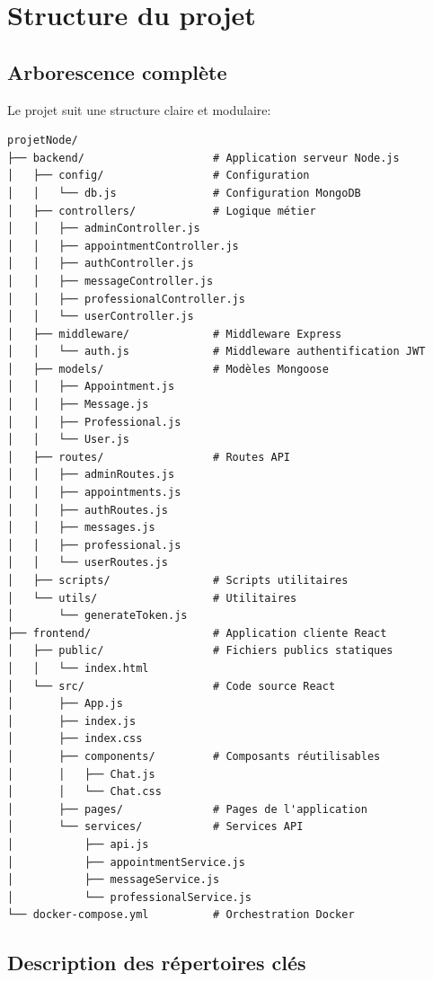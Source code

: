 \documentclass[12pt,a4paper]{article}
\begin{document}
\section{Structure du projet}

\subsection{Arborescence complète}

Le projet suit une structure claire et modulaire:

\begin{verbatim}
projetNode/
├── backend/                    # Application serveur Node.js
│   ├── config/                 # Configuration
│   │   └── db.js               # Configuration MongoDB
│   ├── controllers/            # Logique métier
│   │   ├── adminController.js
│   │   ├── appointmentController.js
│   │   ├── authController.js
│   │   ├── messageController.js
│   │   ├── professionalController.js
│   │   └── userController.js
│   ├── middleware/             # Middleware Express
│   │   └── auth.js             # Middleware authentification JWT
│   ├── models/                 # Modèles Mongoose
│   │   ├── Appointment.js
│   │   ├── Message.js
│   │   ├── Professional.js
│   │   └── User.js
│   ├── routes/                 # Routes API
│   │   ├── adminRoutes.js
│   │   ├── appointments.js
│   │   ├── authRoutes.js
│   │   ├── messages.js
│   │   ├── professional.js
│   │   └── userRoutes.js
│   ├── scripts/                # Scripts utilitaires
│   └── utils/                  # Utilitaires
│       └── generateToken.js
├── frontend/                   # Application cliente React
│   ├── public/                 # Fichiers publics statiques
│   │   └── index.html
│   └── src/                    # Code source React
│       ├── App.js
│       ├── index.js
│       ├── index.css
│       ├── components/         # Composants réutilisables
│       │   ├── Chat.js
│       │   └── Chat.css
│       ├── pages/              # Pages de l'application
│       └── services/           # Services API
│           ├── api.js
│           ├── appointmentService.js
│           ├── messageService.js
│           └── professionalService.js
└── docker-compose.yml          # Orchestration Docker
\end{verbatim}

\subsection{Description des répertoires clés}
\end{document}
